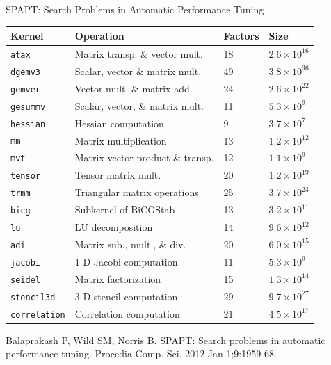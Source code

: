 \documentclass[10pt, compress, aspectratio=169, xcolor={table,usenames,dvipsnames}]{beamer}
\begin{document}
\begin{frame}[label={sec:org6a21771},fragile]{SPAPT: Search Problems in Automatic Performance Tuning}
 \begin{center}
\begin{table}[t]
\label{tab:org4e70924}
\centering
\scriptsize
\begin{tabular}{llll}
\toprule
Kernel & Operation & Factors & Size\\
\midrule
\texttt{atax} & Matrix transp. \& vector mult. & 18 & \(2.6 \times 10^{16}\)\\
\texttt{dgemv3} & Scalar, vector \& matrix mult. & 49 & \(3.8 \times 10^{36}\)\\
\texttt{gemver} & Vector mult. \& matrix add. & 24 & \(2.6 \times 10^{22}\)\\
\texttt{gesummv} & Scalar, vector, \& matrix mult. & 11 & \(5.3 \times 10^{9}\)\\
\texttt{hessian} & Hessian computation & 9 & \(3.7 \times 10^{7}\)\\
\texttt{mm} & Matrix multiplication & 13 & \(1.2 \times 10^{12}\)\\
\texttt{mvt} & Matrix vector product \& transp. & 12 & \(1.1 \times 10^{9}\)\\
\texttt{tensor} & Tensor matrix mult. & 20 & \(1.2 \times 10^{19}\)\\
\texttt{trmm} & Triangular matrix operations & 25 & \(3.7 \times 10^{23}\)\\
\texttt{bicg} & Subkernel of BiCGStab & 13 & \(3.2 \times 10^{11}\)\\
\texttt{lu} & LU decomposition & 14 & \(9.6 \times 10^{12}\)\\
\texttt{adi} & Matrix sub., mult., \& div. & 20 & \(6.0 \times 10^{15}\)\\
\texttt{jacobi} & 1-D Jacobi computation & 11 & \(5.3 \times 10^{9}\)\\
\texttt{seidel} & Matrix factorization & 15 & \(1.3 \times 10^{14}\)\\
\texttt{stencil3d} & 3-D stencil computation & 29 & \(9.7 \times 10^{27}\)\\
\texttt{correlation} & Correlation computation & 21 & \(4.5 \times 10^{17}\)\\
\bottomrule
\end{tabular}
\end{table}

\scriptsize{Balaprakash P, Wild SM, Norris B. SPAPT: Search problems in automatic performance tuning. Procedia Comp. Sci. 2012 Jan 1;9:1959-68.}
\end{center}
\end{frame}
\end{document}
